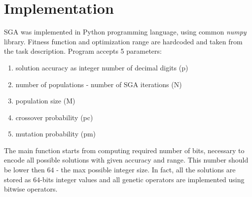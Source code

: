 \documentclass{classrep}
\begin{document}
    \section{Implementation} \label{implementation} {
        SGA was implemented in Python programming language, using common \emph{numpy} library.
        Fitness function and optimization range are hardcoded and taken from the task description.
        Program accepts 5 parameters:
        \begin{enumerate}
            \item solution accuracy as integer number of decimal digits (p)
            \item number of populations - number of SGA iterations (N)
            \item population size (M)
            \item crossover probability (pc)
            \item mutation probability (pm)
        \end{enumerate}

        The main function starts from computing required number of bits, necessary to encode all
        possible solutions with given accuracy and range. This number should be lower then $64$ -
        the max possible integer size. In fact, all the solutions are stored as $64$-bits integer
        values and all genetic operators are implemented using bitwise operators.
    }
\end{document}
